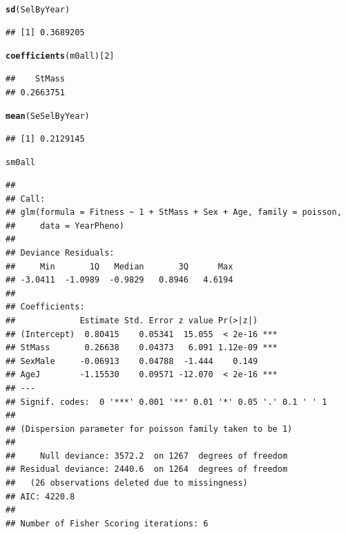 \documentclass{article}\usepackage[]{graphicx}\usepackage[]{color}
\makeatletter
\newcommand{\hlnum}[1]{\textcolor[rgb]{0.686,0.059,0.569}{#1}}%
\newcommand{\hlstd}[1]{\textcolor[rgb]{0.345,0.345,0.345}{#1}}%
\newcommand{\hlkwd}[1]{\textcolor[rgb]{0.737,0.353,0.396}{\textbf{#1}}}%
\newenvironment{kframe}{%
 \def\at@end@of@kframe{}%
 \ifinner\ifhmode%
  \def\at@end@of@kframe{\end{minipage}}%
  \begin{minipage}{\columnwidth}%
 \fi\fi%
 \def\FrameCommand##1{\hskip\@totalleftmargin \hskip-\fboxsep
 \colorbox{shadecolor}{##1}\hskip-\fboxsep
     \hskip-\linewidth \hskip-\@totalleftmargin \hskip\columnwidth}%
 \MakeFramed {\advance\hsize-\width
   \@totalleftmargin\z@ \linewidth\hsize
   \@setminipage}}%
 {\par\unskip\endMakeFramed%
 \at@end@of@kframe}
\newenvironment{knitrout}{}{} %
\makeatother
\begin{document}
\begin{knitrout}
\color{fgcolor}\begin{kframe}
\begin{alltt}
\hlkwd{sd}\hlstd{(SelByYear)}
\end{alltt}
\begin{verbatim}
## [1] 0.3689205
\end{verbatim}
\begin{alltt}
\hlkwd{coefficients}\hlstd{(m0all)[}\hlnum{2}\hlstd{]}
\end{alltt}
\begin{verbatim}
##    StMass 
## 0.2663751
\end{verbatim}
\begin{alltt}
\hlkwd{mean}\hlstd{(SeSelByYear)}
\end{alltt}
\begin{verbatim}
## [1] 0.2129145
\end{verbatim}
\begin{alltt}
\hlstd{sm0all}
\end{alltt}
\begin{verbatim}
## 
## Call:
## glm(formula = Fitness ~ 1 + StMass + Sex + Age, family = poisson, 
##     data = YearPheno)
## 
## Deviance Residuals: 
##     Min       1Q   Median       3Q      Max  
## -3.0411  -1.0989  -0.9829   0.8946   4.6194  
## 
## Coefficients:
##             Estimate Std. Error z value Pr(>|z|)    
## (Intercept)  0.80415    0.05341  15.055  < 2e-16 ***
## StMass       0.26638    0.04373   6.091 1.12e-09 ***
## SexMale     -0.06913    0.04788  -1.444    0.149    
## AgeJ        -1.15530    0.09571 -12.070  < 2e-16 ***
## ---
## Signif. codes:  0 '***' 0.001 '**' 0.01 '*' 0.05 '.' 0.1 ' ' 1
## 
## (Dispersion parameter for poisson family taken to be 1)
## 
##     Null deviance: 3572.2  on 1267  degrees of freedom
## Residual deviance: 2440.6  on 1264  degrees of freedom
##   (26 observations deleted due to missingness)
## AIC: 4220.8
## 
## Number of Fisher Scoring iterations: 6
\end{verbatim}
\end{kframe}
\end{knitrout}
\end{document}
